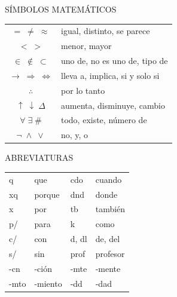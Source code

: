 \documentclass[10pt,a4paper]{article}
\begin{document}
\begin{minipage}[t]{.48\linewidth}
{\small\sffamily\color{KalaAcento}SÍMBOLOS MATEMÁTICOS}\par\vspace{1mm}
\small\renewcommand{\arraystretch}{1.3}
\begin{tabular}{@{}c>{\raggedright\arraybackslash}p{52mm}@{}}
\toprule
\(=\;\neq\;\approx\) & igual, distinto, se parece \\
\(<\;>\) & menor, mayor \\
\(\in\;\notin\;\subset\) & uno de, no es uno de, tipo de \\
\(\to\;\Rightarrow\;\Leftrightarrow\) & lleva a, implica, si y solo si \\
\(\therefore\) & por lo tanto \\
\(\uparrow\;\downarrow\;\Delta\) & aumenta, disminuye, cambio \\
\(\forall\;\exists\;\#\) & todo, existe, número de \\
\(\neg\;\wedge\;\vee\) & no, y, o \\
\bottomrule
\end{tabular}

\vspace{4mm}
{\small\sffamily\color{KalaAcento}ABREVIATURAS}\par\vspace{1mm}
\begin{tabular}{@{}ll@{\qquad}ll@{}}
q & que & cdo & cuando \\
xq & porque & dnd & donde \\
x & por & tb & también \\
p/ & para & k & como \\
c/ & con & d, dl & de, del \\
s/ & sin & prof & profesor \\
-cn & -ción & -mte & -mente \\
-mto & -miento & -dd & -dad \\
\end{tabular}
\end{minipage}
\end{document}
